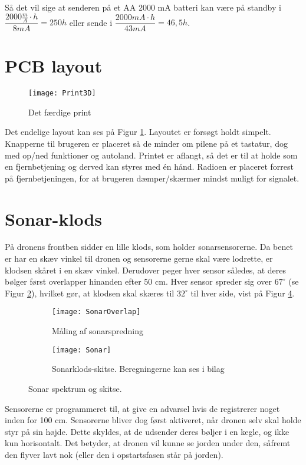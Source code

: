\documentclass[Main]{subfiles}
\begin{document}
Så det vil sige at senderen på et AA 2000 mA batteri kan være på standby i $\dfrac{2000 \frac mA\cdot h}{8 mA} = 250 h$ eller sende i $\dfrac{2000 mA \cdot h}{43 mA} = 46,5 h$.


\newpage
\section{PCB layout}

\begin{figure}[H]
\centering
\texttt{[image: Print3D]}
\caption{Det færdige print}
\label{fig: Print3D}
\end{figure}

Det endelige layout kan ses på Figur \ref{fig: Print3D}.
Layoutet er forsøgt holdt simpelt. 
Knapperne til brugeren er placeret så de minder om pilene på et tastatur, dog med op/ned funktioner og autoland.
Printet er aflangt, så det er til at holde som en fjernbetjening og derved kan styres med én hånd.
Radioen er placeret forrest på fjernbetjeningen, for at brugeren dæmper/skærmer mindst muligt for signalet.  


\newpage
\section{Sonar-klods}\label{Sec:Sonar}
På dronens frontben sidder en lille klods, som holder sonarsensorerne.
Da benet er har en skæv vinkel til dronen og sensorerne gerne skal være lodrette, er klodsen skåret i en skæv vinkel.
Derudover peger hver sensor således, at deres bølger først overlapper hinanden efter 50 cm. 
Hver sensor spreder sig over $67^\circ$ (se Figur \ref{Fig:SonarMeasure}), hvilket gør, at klodsen skal skæres til $32^\circ$ til hver side, vist på Figur \ref{Fig:SonarSkitse}.
\begin{figure}[H]
\centering
	\begin{subfigure}[b]{0.45\textwidth}
		\texttt{[image: SonarOverlap]}
		\caption{Måling af sonarspredning}
		\label{Fig:SonarMeasure}
	\end{subfigure}
	\quad
	\begin{subfigure}[b]{0.45\textwidth}
	\centering
		\texttt{[image: Sonar]}
		\caption{Sonarklods-skitse. Beregningerne kan ses i bilag\cite{Klods}}
		\label{Fig:SonarSkitse}
	\end{subfigure}
	\caption{Sonar spektrum og skitse.}
\end{figure}

Sensorerne er programmeret til, at give en advarsel hvis de registrerer noget inden for 100 cm.
Sensorerne bliver dog først aktiveret, når dronen selv skal holde styr på sin højde. Dette skyldes, at de udsender deres bøljer i en kegle, og ikke kun horisontalt. 
Det betyder, at dronen vil kunne se jorden under den, såfremt den flyver lavt nok (eller den i opstartsfasen står på jorden).
\end{document}
